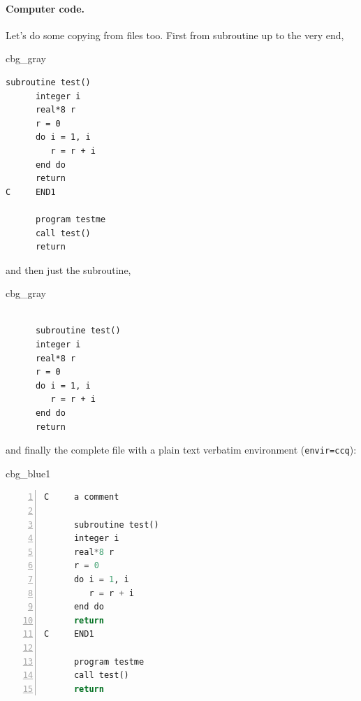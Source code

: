 \n\documentclass[%
oneside,                 %
final,                   %
10pt]{article}
\newenvironment{_cod_tight}[1]{
   \def\FrameCommand{\colorbox{#1}}
   \FrameRule0.6pt\MakeFramed {\FrameRestore}\vskip3mm}
   {\vskip0mm\endMakeFramed}
\newenvironment{cod}[1]{
\bgroup\rmfamily
\fboxsep=0mm\relax
\begin{_cod_tight}{#1}
\list{}{\parsep=-2mm\parskip=0mm\topsep=0pt\leftmargin=2mm
\rightmargin=2\leftmargin\leftmargin=4pt\relax}
\item\relax}
{\endlist\end{_cod_tight}\egroup}
\theoremstyle{definition}
\begin{document}

\paragraph{Computer code.}
Let's do some copying from files too. First from subroutine up to the very end,















\begin{cod}{cbg_gray}\begin{Verbatim}[numbers=none,fontsize=\fontsize{9pt}{9pt},baselinestretch=0.95,xleftmargin=2mm]
      subroutine test()
      integer i
      real*8 r
      r = 0
      do i = 1, i
         r = r + i
      end do
      return
C     END1

      program testme
      call test()
      return

\end{Verbatim}
\end{cod}
\noindent

and then just the subroutine,










\begin{cod}{cbg_gray}\begin{Verbatim}[numbers=none,fontsize=\fontsize{9pt}{9pt},baselinestretch=0.95,xleftmargin=2mm]

      subroutine test()
      integer i
      real*8 r
      r = 0
      do i = 1, i
         r = r + i
      end do
      return

\end{Verbatim}
\end{cod}
\noindent

and finally the complete file with a plain text verbatim environment
(\texttt{envir=ccq}):
















\begin{cod}{cbg_blue1}\begin{lstlisting}[language=Python,style=myspeciallststyle,numbers=left,numberstyle=\tiny,stepnumber=3,numbersep=15pt,xleftmargin=1mm]
C     a comment

      subroutine test()
      integer i
      real*8 r
      r = 0
      do i = 1, i
         r = r + i
      end do
      return
C     END1

      program testme
      call test()
      return

\end{lstlisting}\end{cod}
\noindent
\end{document}
